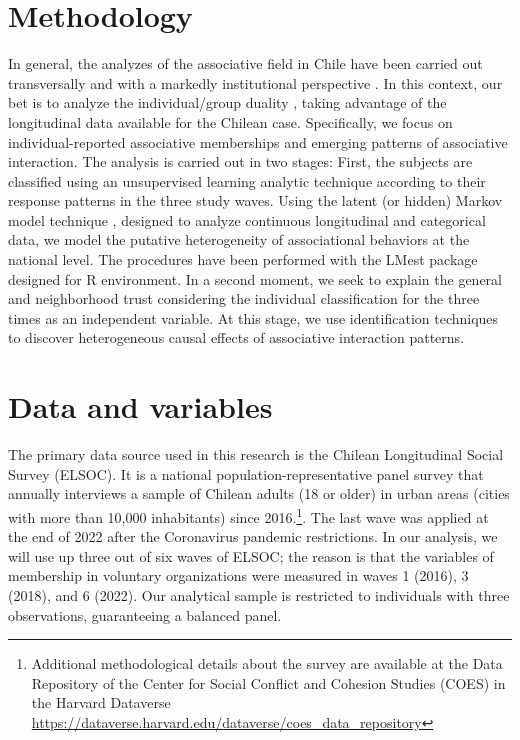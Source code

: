 \section{Methodology}

In general, the analyzes of the associative field in Chile have been carried out transversally and with a markedly institutional perspective \parencite{irarrazaval_chile_2017,irarrazaval_sociedad_2017, programa_de_las_naciones_unidas_para_el_desarrollo_desarrollo_2000}. In this context, our bet is to analyze the individual/group duality \parencite{breiger_duality_1974, mcpherson_hypernetwork_1982}, taking advantage of the longitudinal data available for the Chilean case. Specifically, we focus on individual-reported associative memberships and emerging patterns of associative interaction. The analysis is carried out in two stages: First, the subjects are classified using an unsupervised learning analytic technique \parencite{molina_machine_2019} according to their response patterns in the three study waves. Using the latent (or hidden) Markov model technique \parencite{bartolucci_latent_2015}, designed to analyze continuous longitudinal and categorical data, we model the putative heterogeneity of associational behaviors at the national level. The procedures have been performed with the LMest package \parencite{bartolucci_lmest_2020} designed for R environment. In a second moment, we seek to explain the general and neighborhood trust considering the individual classification for the three times as an independent variable. At this stage, we use identification techniques to discover heterogeneous causal effects of associative interaction patterns.
\bigskip

\section{Data and variables}
The primary data source used in this research is the Chilean Longitudinal Social Survey (ELSOC). It is a national population-representative panel survey that annually interviews a sample of Chilean adults (18 or older) in urban areas (cities with more than 10,000 inhabitants) since 2016.\footnote{Additional methodological details about the survey are available at the Data Repository of the Center for Social Conflict and Cohesion Studies (COES) in the Harvard Dataverse \url{https://dataverse.harvard.edu/dataverse/coes_data_repository}}. The last wave was applied at the end of 2022 after the Coronavirus pandemic restrictions. In our analysis, we will use up three out of six waves of ELSOC; the reason is that the variables of membership in voluntary organizations were measured in waves 1 (2016), 3 (2018), and 6 (2022). Our analytical sample is restricted to individuals with three observations, guaranteeing a balanced panel. 
\bigskip

